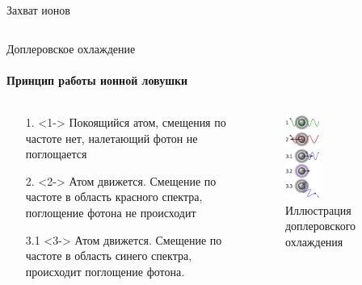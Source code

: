 \documentclass{beamer}
\begin{document}
\begin{frame}{Захват ионов}
\begin{columns}
		\end{columns}
		
	\end{frame}



    \begin{frame}{Доплеровское охлаждение}
    \framesubtitle{Принцип работы ионной ловушки}

        \begin{columns}

        \begin{column}{0.5\textwidth}

            \begin{itemize}
                \item[1.] <1-> Покоящийся атом, смещения по частоте нет, налетающий фотон
                               не поглощается
                \item[2.] <2-> Атом движется. Смещение по частоте в область красного спектра,
                               поглощение фотона не происходит
                \item[3.1] <3-> Атом движется. Смещение по частоте в область синего спектра,
                                происходит поглощение фотона.
            \end{itemize}

        \end{column}

        \begin{column}{0.5\textwidth}
            \begin{figure}
                \centering
                \includegraphics[width=0.35\textwidth]{media/dopler-cooling.png}
                \caption{Иллюстрация доплеровского охлаждения}
            \end{figure}
        \end{column}

        \end{columns}
    \end{frame}
\end{document}
